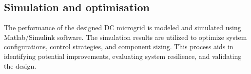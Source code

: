 \subsection{Simulation and optimisation}
The performance of the designed DC microgrid is modeled and simulated using Matlab/Simulink software. The simulation results are utilized to optimize system configurations, control strategies, and component sizing. This process aids in identifying potential improvements, evaluating system resilience, and validating the design.

